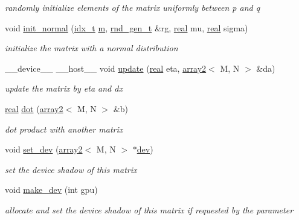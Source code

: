 \begin{DoxyCompactItemize}
\begin{DoxyCompactList}\small\item\em randomly initialize elements of the matrix uniformly between p and q \end{DoxyCompactList}\item 
void \hyperlink{structarray2_af1a26fbee188b317236f8560318a59ce}{init\+\_\+normal} (\hyperlink{vgg__util_8h_a8e93478a00e685bea5e6a3f617bf03a3}{idx\+\_\+t} \hyperlink{structarray2_ae14313ec7a12d47e3654d69ca47391bd}{m}, \hyperlink{structrnd__gen__t}{rnd\+\_\+gen\+\_\+t} \&rg, \hyperlink{vgg__util_8h_a1082d08aaa761215ec83e7149f27ad16}{real} mu, \hyperlink{vgg__util_8h_a1082d08aaa761215ec83e7149f27ad16}{real} sigma)
\begin{DoxyCompactList}\small\item\em initialize the matrix with a normal distribution \end{DoxyCompactList}\item 
\+\_\+\+\_\+device\+\_\+\+\_\+ \+\_\+\+\_\+host\+\_\+\+\_\+ void \hyperlink{structarray2_aa7c888396fa40d51470edc745657326a}{update} (\hyperlink{vgg__util_8h_a1082d08aaa761215ec83e7149f27ad16}{real} eta, \hyperlink{structarray2}{array2}$<$ M, N $>$ \&da)
\begin{DoxyCompactList}\small\item\em update the matrix by eta and dx \end{DoxyCompactList}\item 
\hyperlink{vgg__util_8h_a1082d08aaa761215ec83e7149f27ad16}{real} \hyperlink{structarray2_a7cef3c020d1441b8665e20e048d14c13}{dot} (\hyperlink{structarray2}{array2}$<$ M, N $>$ \&b)
\begin{DoxyCompactList}\small\item\em dot product with another matrix \end{DoxyCompactList}\item 
void \hyperlink{structarray2_a8f0b78337c66dbcc6252d19b756006ea}{set\+\_\+dev} (\hyperlink{structarray2}{array2}$<$ M, N $>$ $\ast$\hyperlink{structarray2_aedc7a89092267367178f4fcd4c9c3ead}{dev})
\begin{DoxyCompactList}\small\item\em set the device shadow of this matrix \end{DoxyCompactList}\item 
void \hyperlink{structarray2_aec8dc1cf7b2d42fca18c187ab1333033}{make\+\_\+dev} (int gpu)
\begin{DoxyCompactList}\small\item\em allocate and set the device shadow of this matrix if requested by the parameter \end{DoxyCompactList}\item 

\end{DoxyCompactItemize}
